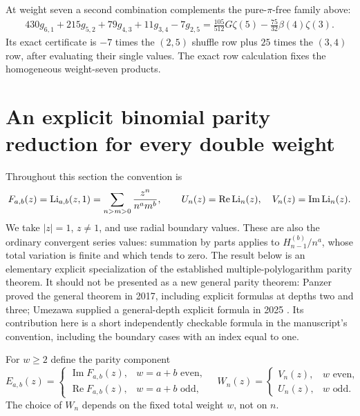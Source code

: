 At weight seven a second combination complements the pure-$\pi$-free
family above:
\begin{align}\label{signed:eq:w7-second}
 430g_{6,1}+215g_{5,2}+79g_{4,3}+11g_{3,4}-7g_{2,5}
 =\frac{105}{512}G\zeta(5)-\frac{75}{32}\beta(4)\zeta(3).
\end{align}
Its exact certificate is $-7$ times the $(2,5)$ shuffle row plus $25$ times
the $(3,4)$ row, after evaluating their single values. The exact row calculation fixes the homogeneous weight-seven products.



\section{An explicit binomial parity reduction for every double weight}
\label{gaussian:sec:double-parity}

Throughout this section the convention is
\[
 F_{a,b}(z)=\operatorname{Li}_{a,b}(z,1)
   =\sum_{n>m>0}\frac{z^n}{n^a m^b},\qquad
 U_n(z)=\operatorname{Re}\operatorname{Li}_n(z),\quad
 V_n(z)=\operatorname{Im}\operatorname{Li}_n(z).
\]
We take $|z|=1$, $z\ne1$, and use radial boundary values. These are also
the ordinary convergent series values: summation by parts applies to
$H_{n-1}^{(b)}/n^a$, whose total variation is finite and which tends to zero.
The result below is an elementary explicit specialization of the established
multiple-polylogarithm parity theorem. It should not be presented as a new
general parity theorem: Panzer proved the general theorem in 2017, including
explicit formulas at depths two and three; Umezawa supplied a general-depth
explicit formula in 2025 \cite{Panzer2017,gaussian:Umezawa}. Its contribution here
is a short independently checkable formula in the manuscript's convention,
including the boundary cases with an index equal to one.

For $w\ge2$ define the parity component
\[
 E_{a,b}(z)=
 \begin{cases}
 \operatorname{Im}F_{a,b}(z),&w=a+b\text{ even},\\
 \operatorname{Re}F_{a,b}(z),&w=a+b\text{ odd},
 \end{cases}
\quad
 W_n(z)=
 \begin{cases}V_n(z),&w\text{ even},\\U_n(z),&w\text{ odd}.
 \end{cases}
\]
The choice of $W_n$ depends on the fixed total weight $w$, not on $n$.


